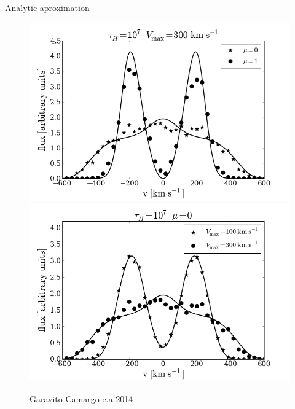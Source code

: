 \documentclass{beamer}
\begin{document}
\begin{frame}{Analytic aproximation}
\begin{figure}
\includegraphics[scale=0.2]{Figures/vary_angle1.png}
\includegraphics[scale=0.2]{Figures/vary_vel1.png}
\caption*{Garavito-Camargo e.a 2014}
\end{figure}
\end{frame}
\end{document}
